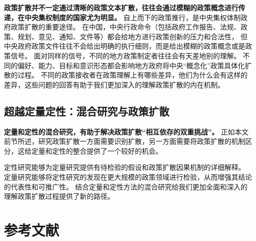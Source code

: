 \documentclass[
  12pt,
]{ctexart}
\begin{document}
\textbf{政策扩散并不一定通过清晰的政策文本扩散，往往会通过模糊的政策概念进行传递，在中央集权制度的国家尤为明显。}
自上而下的政策推行，是中央集权体制政府政策扩散的重要途径。
在中国，中央行政命令（包括政府工作报告、法规、政策、规划、意见、通知、文件等）都会给地方进行政策创新的压力和合法性，
但中央政府政策文件往往不会给出明确的执行细则，而是给出模糊的政策概念或是政策信号。
面对同样的信号，不同的地方政策制定者往往会有天差地别的理解。
不同的偏好、能力、目标和意识形态都会影响地方政府将中央``概念化''政策具体化扩散的过程。
不同的政策接收者在政策理解上有哪些差异，他们为什么会有这样的差异，这些问题的回答有助于我们更加深入的理解政策扩散的内在机制。

\hypertarget{ux8d85ux8d8aux5b9aux91cfux5b9aux6027ux6df7ux5408ux7814ux7a76ux4e0eux653fux7b56ux6269ux6563}{%
\subsection{超越定量定性：混合研究与政策扩散}\label{ux8d85ux8d8aux5b9aux91cfux5b9aux6027ux6df7ux5408ux7814ux7a76ux4e0eux653fux7b56ux6269ux6563}}

\textbf{定量和定性的混合研究，有助于解决政策扩散``相互依存的双重挑战''。}
正如本文前节所述，研究政策扩散一方面需要识别扩散，另一方面需要将政策扩散的机制区分，这给定量和定性的整合提供了一个较好的机会。

定性研究能够为定量研究提供有待检验的假设和政策扩散因果机制的详细解释。
定量研究能够将定性研究的发现在更大规模的政策领域进行检验，从而增强其结论的代表性和可推广性。
结合定量和定性方法的混合研究给我们更加全面和深入的理解政策扩散过程提供了新的路径。

\newpage

\hypertarget{ux53c2ux8003ux6587ux732e}{%
\section{参考文献}\label{ux53c2ux8003ux6587ux732e}}
\end{document}
